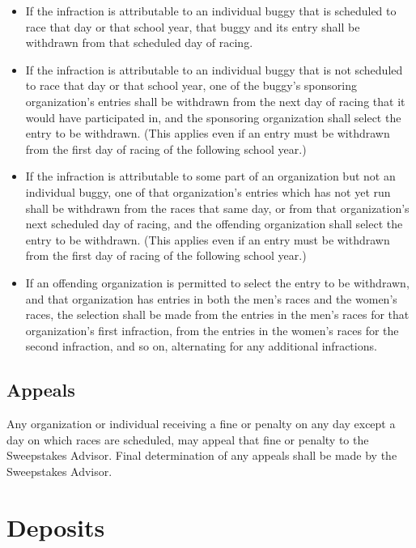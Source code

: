 	\begin{itemize}

		\item
		If the infraction is attributable to an individual buggy that is scheduled to
		race that day or that school year, that buggy and its entry shall be withdrawn
		from that scheduled day of racing.

		\item
		If the infraction is attributable to an individual buggy that is not scheduled
		to race that day or that school year, one of the buggy's sponsoring
		organization's entries shall be withdrawn from the next day of racing that it
		would have participated in, and the sponsoring organization shall select the
		entry to be withdrawn. (This applies even if an entry must be withdrawn from
		the first day of racing of the following school year.)

		\item
		If the infraction is attributable to some part of an organization but not an
		individual buggy, one of that organization's entries which has not yet run
		shall be withdrawn from the races that same day, or from that organization's
		next scheduled day of racing, and the offending organization shall select the
		entry to be withdrawn. (This applies even if an entry must be withdrawn from
		the first day of racing of the following school year.)

		\item
		If an offending organization is permitted to select the entry to be withdrawn,
		and that organization has entries in both the men's races and the women's
		races, the selection shall be made from the entries in the men's races for that
		organization's first infraction, from the entries in the women's races for the
		second infraction, and so on, alternating for any additional infractions.

	\end{itemize}

\subsection{Appeals}

	Any organization or individual receiving a fine or penalty on any day except a
	day on which races are scheduled, may appeal that fine or penalty to the
	Sweepstakes Advisor. Final determination of any appeals shall be made by the
	Sweepstakes Advisor.

\section{Deposits}


